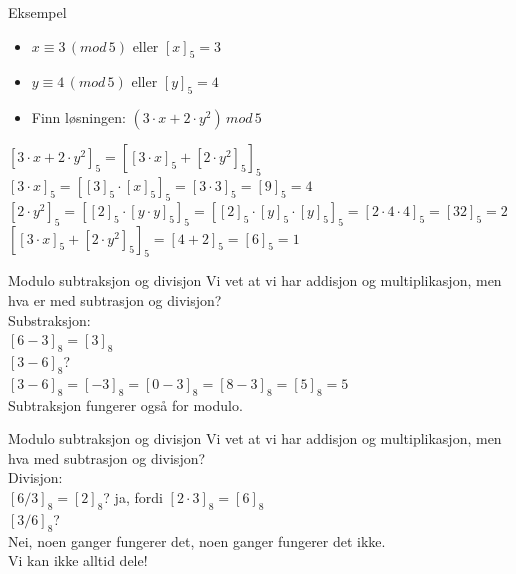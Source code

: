 \begin{frame}{}
\begin{exampleblock}{Eksempel}
\begin{itemize}
\item $x \equiv 3\,(mod\, 5)$ eller $[x]_5=3$
\item $y \equiv 4\,(mod\, 5)$ eller $[y]_5=4$
\item Finn løsningen: $(3\cdot x+2\cdot y^2)\, mod\,5$
\end{itemize}
\end{exampleblock}
\pause
\medskip

$[3\cdot x+2\cdot y^2]_5=[[3\cdot x]_5+[2\cdot y^2]_5]_5$\\

$[3\cdot x]_5=[[3]_5\cdot [x]_5]_5=[3\cdot 3]_5=[9]_5=4$\\
$[2\cdot y^2]_5=[[2]_5\cdot [y\cdot y]_5]_5=[[2]_5\cdot [y]_5\cdot[y]_5]_5=[2\cdot 4\cdot 4]_5=[32]_5=2$\\

$[[3\cdot x]_5+[2\cdot y^2]_5]_5=[4+2]_5=[6]_5=1$
\end{frame}

\begin{frame}[fragile]{Modulo subtraksjon og divisjon}
       Vi vet at vi har addisjon og multiplikasjon, men hva er med subtrasjon og divisjon?\\

Substraksjon:\\
$[6-3]_8=[3]_8$\\
$[3-6]_8$?\\
\pause
$[3-6]_8=[-3]_8=[0-3]_8=[8-3]_8=[5]_8=5$\\

Subtraksjon fungerer også for modulo.  
\end{frame}

\begin{frame}{Modulo subtraksjon og divisjon}
Vi vet at vi har addisjon og multiplikasjon, men hva med subtrasjon og divisjon?\\

Divisjon:\\
$[6/3]_8=[2]_8$? \pause ja, fordi $[2\cdot 3]_8=[6]_8$\\
$[3/6]_8$?\\
\pause
Nei, noen ganger fungerer det, noen ganger fungerer det ikke.\\

Vi kan ikke alltid dele!
\end{frame}

